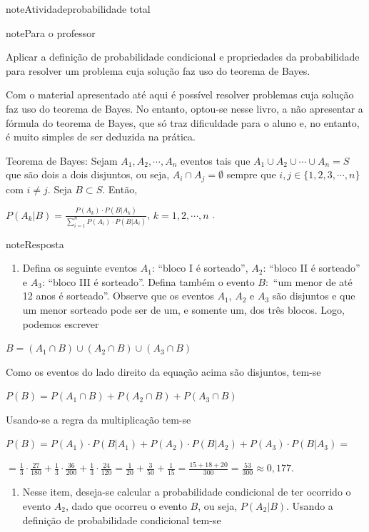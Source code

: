 \begin{sphinxadmonition}{note}{Atividade}{probabilidade total}
\label{ativ-tbayes}

\begin{sphinxadmonition}{note}{Para o professor}

 Aplicar a definição de probabilidade condicional e propriedades da probabilidade para resolver um problema cuja solução faz uso do teorema de Bayes.

 Com o material apresentado até aqui é possível resolver problemas cuja solução faz uso do teorema de Bayes. No entanto, optou-se nesse livro, a não apresentar a fórmula do teorema de Bayes, que só traz dificuldade para o aluno e, no entanto, é muito simples de ser deduzida na prática.

Teorema de Bayes: Sejam \(A_1, A_2, \cdots, A_n\) eventos tais que \(A_1\cup A_2\cup \cdots \cup A_n=S\) que são dois a dois disjuntos, ou seja, \(A_i\cap A_j=\emptyset\) sempre que \(i,j\in\{1,2,3,\cdots, n\}\) com \(i \neq j\). Seja \(B\subset S\). Então,

\(P(A_k|B)=\frac{P(A_k)\cdot P(B|A_k)}{\displaystyle{\sum^n_{i=1}}P(A_i)\cdot P(B|A_i)}\), \(k=1,2,\cdots, n\) .

\begin{sphinxadmonition}{note}{Resposta}

\begin{enumerate}
\item {} 
Defina os seguinte eventos \(A_1\): “bloco I é sorteado”, \(A_2\): “bloco II é sorteado” e  \(A_3\): “bloco III é sorteado”. Defina também o evento \(B:\) “um menor de até 12 anos é sorteado”. Observe que os eventos \(A_1\), \(A_2\) e \(A_3\) são disjuntos e que um menor sorteado pode ser de um, e somente um, dos três blocos. Logo, podemos escrever

\end{enumerate}

\(B=(A_1\cap B)\cup (A_2\cap B) \cup (A_3\cap B)\)

Como os eventos do lado direito da equação acima são disjuntos, tem-se

\(P(B)=P(A_1\cap B)+P(A_2\cap B)+P(A_3\cap B)\)

Usando-se a regra da multiplicação tem-se

\(P(B)=P(A_1)\cdot P(B|A_1)+P(A_2)\cdot P(B|A_2)+P(A_3)\cdot P(B|A_3)=\)

\(=\frac{1}{3}\cdot \frac{27}{180}+\frac{1}{3}\cdot\frac{36}{200}+\frac{1}{3}\cdot\frac{24}{120}=\frac{1}{20}+\frac{3}{50}+\frac{1}{15}=\frac{15+18+20}{300}=\frac{53}{300}\approx 0,177\).
\begin{enumerate}
\item {} 
Nesse item, deseja-se calcular a probabilidade condicional de ter ocorrido o evento \(A_2\), dado que ocorreu o evento \(B\), ou seja, \(P(A_2|B)\). Usando a definição de probabilidade condicional tem-se


\end{enumerate}
\end{sphinxadmonition}
\end{sphinxadmonition}
\end{sphinxadmonition}
